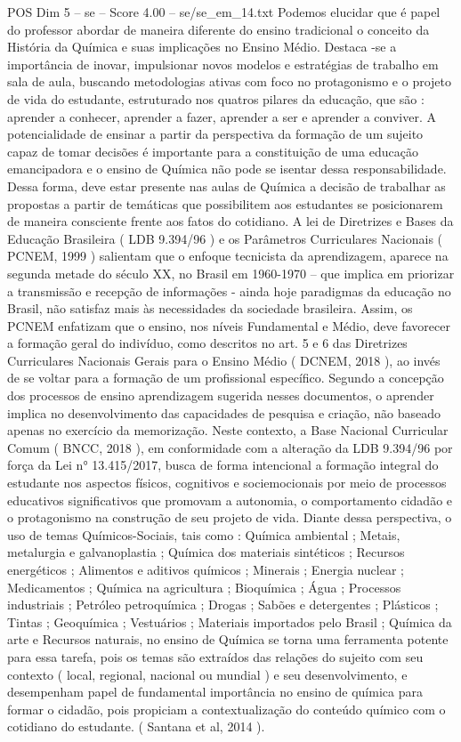 \begin{textsample}{POS Dim 5 – se – Score 4.00 – se/se\_em\_14.txt}
Podemos elucidar que é papel do professor abordar de maneira diferente do ensino tradicional o conceito da História da Química e suas implicações no Ensino Médio.
Destaca -se a importância de inovar, impulsionar novos modelos e estratégias de trabalho em sala de aula, buscando metodologias ativas com foco no protagonismo e o projeto de vida do estudante, estruturado nos quatros pilares da educação, que são : aprender a conhecer, aprender a fazer, aprender a ser e aprender a conviver.
A potencialidade de ensinar a partir da perspectiva da formação de um sujeito capaz de tomar decisões é importante para a constituição de uma educação emancipadora e o ensino de Química não pode se isentar dessa responsabilidade.
Dessa forma, deve estar presente nas aulas de Química a decisão de trabalhar as propostas a partir de temáticas que possibilitem aos estudantes se posicionarem de maneira consciente frente aos fatos do cotidiano.
A lei de Diretrizes e Bases da Educação Brasileira ( LDB 9.394/96 ) e os Parâmetros Curriculares Nacionais ( PCNEM, 1999 ) salientam que o enfoque tecnicista da aprendizagem, aparece na segunda metade do século XX, no Brasil em 1960-1970 – que implica em priorizar a transmissão e recepção de informações - ainda hoje paradigmas da educação no Brasil, não satisfaz mais às necessidades da sociedade brasileira.
Assim, os PCNEM enfatizam que o ensino, nos níveis Fundamental e Médio, deve favorecer a formação geral do indivíduo, como descritos no art. 5 e 6 das Diretrizes Curriculares Nacionais Gerais para o Ensino Médio ( DCNEM, 2018 ), ao invés de se voltar para a formação de um profissional específico.
Segundo a concepção dos processos de ensino aprendizagem sugerida nesses documentos, o aprender implica no desenvolvimento das capacidades de pesquisa e criação, não baseado apenas no exercício da memorização.
Neste contexto, a Base Nacional Curricular Comum ( BNCC, 2018 ), em conformidade com a alteração da LDB 9.394/96 por força da Lei n{\EmojiFont °} 13.415/2017, busca de forma intencional a formação integral do estudante nos aspectos físicos, cognitivos e sociemocionais por meio de processos educativos significativos que promovam a autonomia, o comportamento cidadão e o protagonismo na construção de seu projeto de vida.
Diante dessa perspectiva, o uso de temas Químicos-Sociais, tais como : Química ambiental ; Metais, metalurgia e galvanoplastia ; Química dos materiais sintéticos ; Recursos energéticos ; Alimentos e aditivos químicos ; Minerais ; Energia nuclear ; Medicamentos ; Química na agricultura ; Bioquímica ; Água ; Processos industriais ; Petróleo petroquímica ; Drogas ; Sabões e detergentes ; Plásticos ; Tintas ; Geoquímica ; Vestuários ; Materiais importados pelo Brasil ; Química da arte e Recursos naturais, no ensino de Química se torna uma ferramenta potente para essa tarefa, pois os temas são extraídos das relações do sujeito com seu contexto ( local, regional, nacional ou mundial ) e seu desenvolvimento, e desempenham papel de fundamental importância no ensino de química para formar o cidadão, pois propiciam a contextualização do conteúdo químico com o cotidiano do estudante. ( Santana et al, 2014 ).

\end{textsample}
